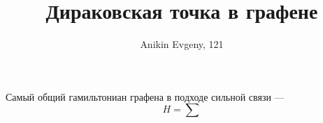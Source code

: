 \documentclass{article}
\title{Дираковская точка в графене}
\author{Anikin Evgeny, 121}
\begin{document}
\maketitle
Самый общий гамильтониан графена в подходе сильной связи ---
\begin{equation}
	H = \sum 
\end{equation}
\end{document}
